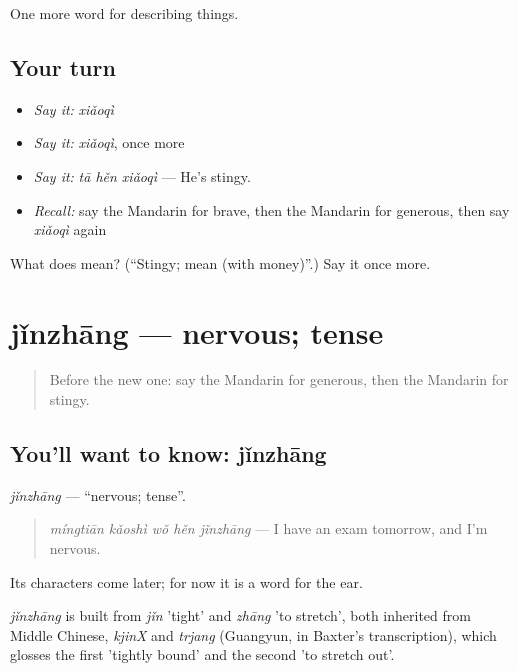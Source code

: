\begin{grammarlens}[title={What you've built}]
One more word for describing things.
\end{grammarlens}

\subsection*{Your turn}
\begin{itemize}
\raggedright
  \item \emph{Say it:} \emph{xiǎoqì}
  \item \emph{Say it:} \emph{xiǎoqì}, once more
  \item \emph{Say it:} \emph{tā hěn xiǎoqì} — He's stingy.
  \item \emph{Recall:} say the Mandarin for brave, then the Mandarin for generous, then say \emph{xiǎoqì} again
\end{itemize}

\begin{tcolorbox}[breakable,colback=teal!4,colframe=teal!35!black,title={Before you move on}]
What does  mean? (\textquotedblleft{}Stingy; mean (with money)\textquotedblright{}.) Say it once more.
\end{tcolorbox}
\section[jǐnzhāng]{jǐnzhāng — nervous; tense}

\label{lesson:ZH-C265-jinzhang}



\begin{quote}
Before the new one: say the Mandarin for generous, then the Mandarin for stingy.
\end{quote}

\subsection*{You'll want to know: jǐnzhāng}
\emph{jǐnzhāng} — \textquotedblleft{}nervous; tense\textquotedblright{}.

\begin{quote}
\emph{míngtiān kǎoshì wǒ hěn jǐnzhāng} — I have an exam tomorrow, and I'm nervous.
\end{quote}

Its characters come later; for now it is a word for the ear.

\begin{cousinweb}
\emph{jǐnzhāng} is built from \emph{jǐn} 'tight' and \emph{zhāng} 'to stretch', both inherited from Middle Chinese, \emph{kjinX} and \emph{trjang} (Guangyun, in Baxter's transcription), which glosses the first 'tightly bound' and the second 'to stretch out'.
\end{cousinweb}

